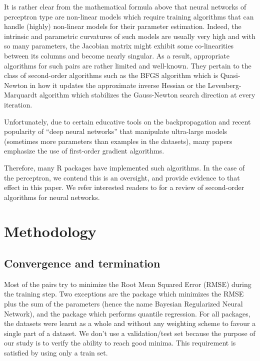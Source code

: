 It is rather clear from the mathematical formula above that neural
networks of perceptron type are non-linear models which require training
algorithms that can handle (highly) non-linear models for their
parameter estimation. Indeed, the intrinsic and parametric curvatures of
such models are usually very high and with so many parameters, the
Jacobian matrix might exhibit some co-linearities between its columns
and become nearly singular. As a result, appropriate algorithms for such
 pairs are rather limited and well-known. They
pertain to the class of second-order algorithms such as the BFGS
algorithm which is Quasi-Newton in how it updates the approximate
inverse Hessian or the Levenberg-Marquardt algorithm which stabilizes
the Gauss-Newton search direction at every iteration.

Unfortunately, due to certain educative tools on the backpropagation and
recent popularity of ``deep neural networks'' that manipulate
ultra-large models (sometimes more parameters than examples in the
datasets), many papers emphasize the use of first-order gradient
algorithms.

Therefore, many \textsf{R} packages have implemented such algorithms. In
the case of the perceptron, we contend this is an oversight, and provide
evidence to that effect in this paper. We refer interested readers to
\citep{tan2019review} for a review of second-order algorithms for neural
networks.

\hypertarget{methodology}{%
\section{Methodology}\label{methodology}}

\hypertarget{convergence-and-termination}{%
\subsection{Convergence and
termination}\label{convergence-and-termination}}

Most of the  pairs try to minimize the Root Mean
Squared Error (RMSE) during the training step. Two exceptions are the
 package which minimizes the RMSE plus the sum of the
parameters (hence the name Bayesian Regularized Neural Network), and the
 package which performs quantile regression. For all
packages, the datasets were learnt as a whole and without any weighting
scheme to favour a single part of a dataset. We don't use a
validation/test set because the purpose of our study is to verify the
ability to reach good minima. This requirement is satisfied by using
only a train set.


